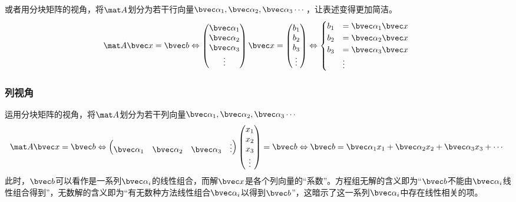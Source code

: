 或者用分块矩阵的视角，将$\mat A$划分为若干行向量$\bvec \alpha_1, \bvec \alpha_2,\bvec \alpha_3\cdots$，让表述变得更加简洁。
$$
\mat A \bvec x=\bvec b \Leftrightarrow 
\begin{pmatrix}
\bvec \alpha_1 \\
\bvec \alpha_2 \\
\bvec \alpha_3 \\
\vdots
\end{pmatrix}
\bvec x
=
\begin{pmatrix}
b_{1} \\
b_{2} \\
b_{3} \\
\vdots
\end{pmatrix}
\Leftrightarrow 
\begin{cases}
b_1&=\bvec \alpha_1 \bvec x \\
b_2&=\bvec \alpha_2 \bvec x \\
b_3&=\bvec \alpha_3 \bvec x \\
&\vdots
\end{cases}~
$$

\subsubsection{列视角}
运用分块矩阵的视角，将$\mat A$划分为若干列向量$\bvec \alpha_1, \bvec \alpha_2,\bvec \alpha_3\cdots$
$$
\mat A \bvec x=\bvec b \Leftrightarrow 
\begin{pmatrix}
\bvec \alpha_1& \bvec \alpha_2& \bvec \alpha_3&\vdots
\end{pmatrix}
\begin{pmatrix}
x_{1} \\
x_{2} \\
x_{3} \\
\vdots
\end{pmatrix}
=
\bvec b
\Leftrightarrow 
\bvec b = \bvec \alpha_1 x_1+\bvec \alpha_2 x_2+\bvec \alpha_3 x_3+\cdots~
$$
此时，$\bvec b$可以看作是一系列$\bvec \alpha_i$的线性组合，而解$\bvec x$是各个列向量的“系数”。方程组无解的含义即为“$\bvec b$不能由$\bvec \alpha_i$线性组合得到”，无数解的含义即为“有无数种方法线性组合$\bvec \alpha_i$以得到$\bvec b$”，这暗示了这一系列$\bvec \alpha_i$中存在线性相关的项。

